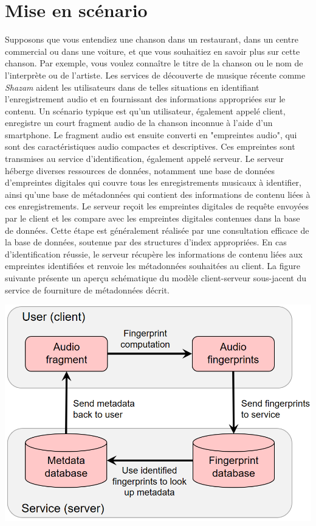 \documentclass[11pt, report, french]{scrreprt}
\begin{document}
\section{Mise en scénario}
Supposons que vous entendiez une chanson dans un restaurant, dans un centre commercial ou dans une voiture, et que vous souhaitiez en savoir plus sur cette chanson. Par exemple, vous voulez connaître le titre de la chanson ou le nom de l'interprète ou de l'artiste. Les services de découverte de musique récente comme \textit{Shazam} aident les utilisateurs dans de telles situations en identifiant l'enregistrement audio et en fournissant des informations appropriées sur le contenu. Un scénario typique est qu'un utilisateur, également appelé client, enregistre un court fragment audio de la chanson inconnue à l'aide d'un smartphone. Le fragment audio est ensuite converti en "empreintes audio", qui sont des caractéristiques audio compactes et descriptives. Ces empreintes sont transmises au service d'identification, également appelé serveur. Le serveur héberge diverses ressources de données, notamment une base de données d'empreintes digitales qui couvre tous les enregistrements musicaux à identifier, ainsi qu'une base de métadonnées qui contient des informations de contenu liées à ces enregistrements. Le serveur reçoit les empreintes digitales de requête envoyées par le client et les compare avec les empreintes digitales contenues dans la base de données. Cette étape est généralement réalisée par une consultation efficace de la base de données, soutenue par des structures d'index appropriées. En cas d'identification réussie, le serveur récupère les informations de contenu liées aux empreintes identifiées et renvoie les métadonnées souhaitées au client. La figure suivante présente un aperçu schématique du modèle client-serveur sous-jacent du service de fourniture de métadonnées décrit.\\

\begin{center}
	\includegraphics[scale=0.3]{img/general_schema.png}
\end{center}
\end{document}
